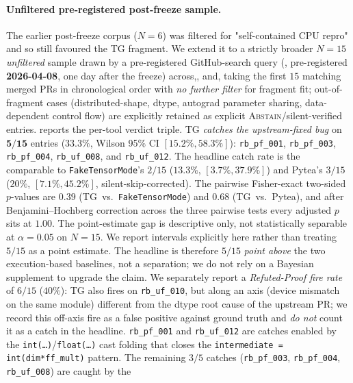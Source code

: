 \paragraph{Unfiltered pre-registered post-freeze sample.}
The earlier post-freeze corpus ($N{=}6$) was filtered for
"self-contained CPU repro" and so still favoured the \textsc{TG}
fragment. We extend it to a strictly broader $N{=}15$
\emph{unfiltered} sample drawn by a pre-registered
GitHub-search query (,
pre-registered \textbf{2026-04-08}, one day after the freeze)
across,,
and, taking the first $15$ matching merged
PRs in chronological order with \emph{no further filter} for fragment
fit; out-of-fragment cases (distributed-shape, dtype, autograd
parameter sharing, data-dependent control flow) are explicitly
retained as explicit \textsc{Abstain}/silent-verified entries.
 reports the per-tool verdict triple.
\textsc{TG} \emph{catches the upstream-fixed bug} on
$\mathbf{5/15}$ entries ($\mathbf{33.3\%}$, Wilson 95\% CI
$[15.2\%, 58.3\%]$): \texttt{rb\_pf\_001},
\texttt{rb\_pf\_003}, \texttt{rb\_pf\_004}, \texttt{rb\_uf\_008},
and \texttt{rb\_uf\_012}. The headline catch rate is the comparable
to \texttt{FakeTensorMode}'s $2/15$ ($13.3\%$, $[3.7\%, 37.9\%]$) and
Pytea's $3/15$ ($20\%$, $[7.1\%, 45.2\%]$, silent-skip-corrected).
The pairwise Fisher-exact two-sided $p$-values are
$0.39$ (\textsc{TG}~vs.\ \texttt{FakeTensorMode}) and $0.68$
(\textsc{TG}~vs.\ Pytea), and after Benjamini--Hochberg correction
across the three pairwise tests every adjusted $p$ sits at $1.00$.
The point-estimate gap is descriptive only, not statistically
separable at $\alpha{=}0.05$ on $N{=}15$. We report intervals
explicitly here rather than treating $5/15$ as a point estimate.
The headline is therefore $5/15$ \emph{point above} the two
execution-based baselines, not a separation; we do not rely on a
Bayesian supplement to upgrade the claim.
We separately report a
\emph{Refuted-Proof fire rate} of $6/15$ ($40\%$): \textsc{TG}
also fires on \texttt{rb\_uf\_010}, but along an axis (device
mismatch on the same module) different from the dtype root cause
of the upstream PR; we record this off-axis fire as a false
positive against ground truth and \emph{do not} count it as a
catch in the headline. \texttt{rb\_pf\_001} and
\texttt{rb\_uf\_012} are catches enabled
by the \texttt{int(\ldots)}/\texttt{float(\ldots)} cast folding
that closes the \texttt{intermediate = int(dim*ff\_mult)} pattern.
The remaining $3/5$ catches (\texttt{rb\_pf\_003},
\texttt{rb\_pf\_004}, \texttt{rb\_uf\_008}) are caught by the
